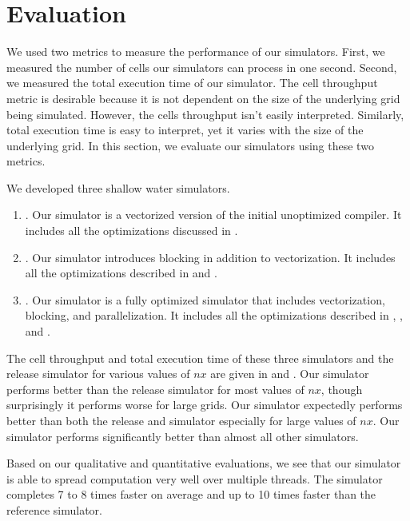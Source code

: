 \newcommand{\cps}{\frac{\text{cells}}{s}}

\section{Evaluation}\label{sec:evaluation}
We used two metrics to measure the performance of our simulators. First, we
measured the number of cells our simulators can process in one second. Second,
we measured the total execution time of our simulator. The cell throughput
metric is desirable because it is not dependent on the size of the underlying
grid being simulated. However, the cells throughput isn't easily interpreted.
Similarly, total execution time is easy to interpret, yet it varies with the
size of the underlying grid. In this section, we evaluate our simulators using
these two metrics.

We developed three shallow water simulators.
\begin{enumerate}
  \item {}.
    Our  simulator is a vectorized version of the initial unoptimized
    compiler. It includes all the optimizations discussed in
    .

  \item {}.
    Our  simulator introduces blocking in addition to vectorization.
    It includes all the optimizations described in  and
    .

  \item {}.
    Our  simulator is a fully optimized simulator that includes
    vectorization, blocking, and parallelization. It includes all the
    optimizations described in , ,
    and .
\end{enumerate}

The cell throughput and total execution time of these three simulators and the
release simulator for various values of $nx$ are given in
 and . Our 
simulator performs better than the release simulator for most values of $nx$,
though surprisingly it performs worse for large grids. Our 
simulator expectedly performs better than both the release and 
simulator especially for large values of $nx$. Our  simulator performs
significantly better than almost all other simulators.

Based on our qualitative and quantitative evaluations, we see that our
 simulator is able to spread computation very well over multiple
threads. The  simulator completes 7 to 8 times faster on average and
up to 10 times faster than the reference simulator.


